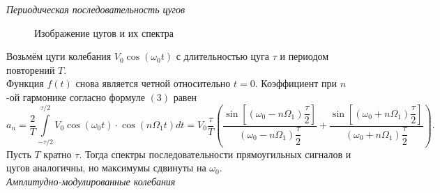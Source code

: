 \documentclass[a4paper, 12pt]{article}%
\begin{document}
	\textit{Периодическая последовательность цугов}\\
	
	\begin{figure}[H]
		\caption{Изображение цугов и их спектра}
	\end{figure}
	Возьмём цуги колебания $V_0 \cos(\omega_0 t)$ с длительностью цуга $\tau$ и периодом повторений $T$.\\
	Функция $f(t)$ снова является четной относительно $t = 0$. Коэффициент при $n$-ой гармонике согласно формуле $(3)$ равен
	\begin{equation}
		a_n = \dfrac{2}{T}\int\limits_{-\tau/2}^{\tau/2}V_0 \cos \left(\omega_0t\right) \cdot \cos\left(n \Omega_1t\right)dt = V_0 \dfrac{\tau}{T}\left( \dfrac{\sin\left[\left(\omega_0 - n \Omega_1\right)\dfrac{\tau}{2}\right]}{\left( \omega_0 - n \Omega_1\right) \dfrac{\tau}{2}} + \dfrac{\sin\left[\left(\omega_0 + n \Omega_1\right)\dfrac{\tau}{2}\right]}{\left( \omega_0 + n \Omega_1\right) \dfrac{\tau}{2}}\right).
	\end{equation}
	Пусть $T$ кратно $\tau$. Тогда спектры последовательности прямоугильных сигналов и цугов аналогичны, но максимумы сдвинуты на $\omega_0$.\\
	
	\textit{Амплитудно-модулированные колебания}\\
	
\end{document}
